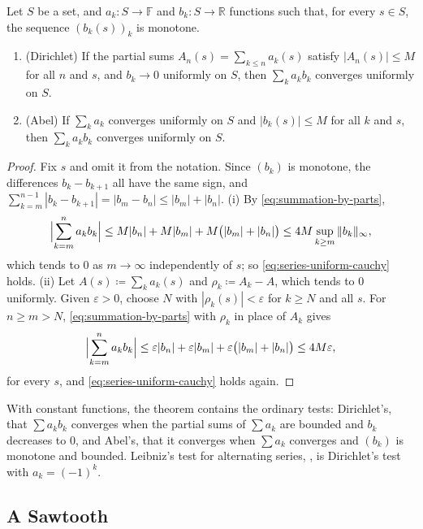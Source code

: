 \begin{theorem}
\label{thm:abel-dirichlet}
Let $S$ be a set, and $a_k\colon S\to\mathbb F$ and $b_k\colon S\to\mathbb R$ functions such that, for every $s\in S$, the sequence $(b_k(s))_k$ is monotone.
\begin{enumerate}
\item (Dirichlet) If the partial sums $A_n(s)=\sum_{k\le n}a_k(s)$ satisfy $|A_n(s)|\le M$ for all $n$ and $s$, and $b_k\to0$ uniformly on $S$, then $\sum_ka_kb_k$ converges uniformly on $S$.
\item (Abel) If $\sum_ka_k$ converges uniformly on $S$ and $|b_k(s)|\le M$ for all $k$ and $s$, then $\sum_ka_kb_k$ converges uniformly on $S$.
\end{enumerate}
\end{theorem}

\begin{proof}
Fix $s$ and omit it from the notation. Since $(b_k)$ is monotone, the differences $b_k-b_{k+1}$ all have the same sign, and $\sum_{k=m}^{n-1}|b_k-b_{k+1}|=|b_m-b_n|\le|b_m|+|b_n|$. (i) By \eqref{eq:summation-by-parts},
\[
\Bigl|\sum_{k=m}^na_kb_k\Bigr|\le M|b_n|+M|b_m|+M\bigl(|b_m|+|b_n|\bigr)\le4M\sup_{k\ge m}\|b_k\|_\infty ,
\]
which tends to $0$ as $m\to\infty$ independently of $s$; so \eqref{eq:series-uniform-cauchy} holds. (ii) Let $A(s)\coloneqq\sum_ka_k(s)$ and $\rho_k\coloneqq A_k-A$, which tends to $0$ uniformly. Given $\varepsilon>0$, choose $N$ with $|\rho_k(s)|<\varepsilon$ for $k\ge N$ and all $s$. For $n\ge m>N$, \eqref{eq:summation-by-parts} with $\rho_k$ in place of $A_k$ gives
\[
\Bigl|\sum_{k=m}^na_kb_k\Bigr|\le\varepsilon|b_n|+\varepsilon|b_m|+\varepsilon\bigl(|b_m|+|b_n|\bigr)\le4M\varepsilon ,
\]
for every $s$, and \eqref{eq:series-uniform-cauchy} holds again.
\end{proof}

With constant functions, the theorem contains the ordinary tests: Dirichlet's, that $\sum a_kb_k$ converges when the partial sums of $\sum a_k$ are bounded and $b_k$ decreases to $0$, and Abel's, that it converges when $\sum a_k$ converges and $(b_k)$ is monotone and bounded. Leibniz's test for alternating series, , is Dirichlet's test with $a_k=(-1)^k$.

\subsection{A Sawtooth}

